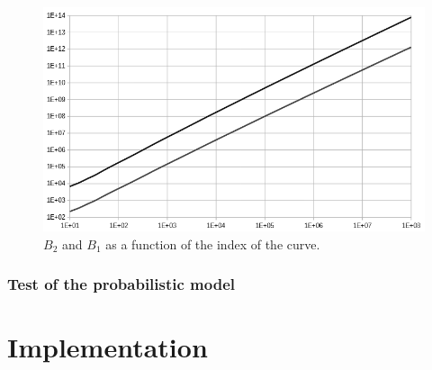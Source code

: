 \documentclass[a4paper, 11pt, pdftex]{report}
\theoremstyle{plain}
\theoremstyle{definition}
\begin{document}
\begin{figure}[!ht]
	\vspace*{0.0cm}
	\centering
	\includegraphics[width=15.5cm, angle=0]{img/B1_B2_n.png}
	\caption{\label{fig:B12_n} $B_2$ and $B_1$ as a function of the index of the curve.}
\end{figure}


\subsection{Test of the probabilistic model}



\chapter{Implementation}
\end{document}

